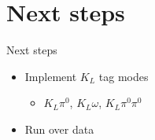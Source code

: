 \documentclass{beamer}
\begin{document}
\section{Next steps}
\begin{frame}{Next steps}
  \begin{itemize}
    \item{Implement $K_L$ tag modes}
    \begin{itemize}
      \item{$K_L\pi^0$, $K_L\omega$, $K_L\pi^0\pi^0$}
    \end{itemize}
    \item{Run over data}
  \end{itemize}
\end{frame}
\end{document}
